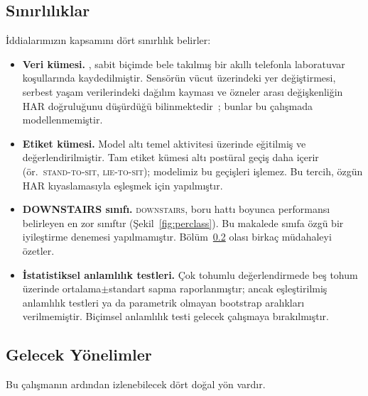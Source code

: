 \subsection{Sınırlılıklar}
\label{sec:disc:limitations}

İddialarımızın kapsamını dört sınırlılık belirler:

\begin{itemize}
\item \textbf{Veri kümesi.} \hapt{}, sabit biçimde bele takılmış bir
akıllı telefonla laboratuvar koşullarında kaydedilmiştir. Sensörün
vücut üzerindeki yer değiştirmesi, serbest yaşam verilerindeki dağılım
kayması ve özneler arası değişkenliğin HAR doğruluğunu düşürdüğü
bilinmektedir~\cite{wang2019harsurvey,demrozi2020harsurvey}; bunlar
bu çalışmada modellenmemiştir.

\item \textbf{Etiket kümesi.} Model altı temel \hapt{} aktivitesi
üzerinde eğitilmiş ve değerlendirilmiştir. Tam \hapt{} etiket kümesi
altı postüral geçiş daha içerir (ör.\ \textsc{stand-to-sit},
\textsc{lie-to-sit}); modelimiz bu geçişleri işlemez. Bu tercih,
özgün \fastgrnn{} HAR kıyaslamasıyla eşleşmek için yapılmıştır.

\item \textbf{DOWNSTAIRS sınıfı.} \textsc{downstairs}, boru hattı
boyunca performansı belirleyen en zor sınıftır
(Şekil~\ref{fig:perclass}). Bu makalede sınıfa özgü bir iyileştirme
denemesi yapılmamıştır. Bölüm~\ref{sec:disc:future} olası birkaç
müdahaleyi özetler.

\item \textbf{İstatistiksel anlamlılık testleri.} Çok tohumlu
değerlendirmede beş tohum üzerinde ortalama$\pm$standart sapma
raporlanmıştır; ancak eşleştirilmiş anlamlılık testleri ya da
parametrik olmayan bootstrap aralıkları verilmemiştir. Biçimsel
anlamlılık testi gelecek çalışmaya bırakılmıştır.
\end{itemize}

\subsection{Gelecek Yönelimler}
\label{sec:disc:future}

Bu çalışmanın ardından izlenebilecek dört doğal yön vardır.

